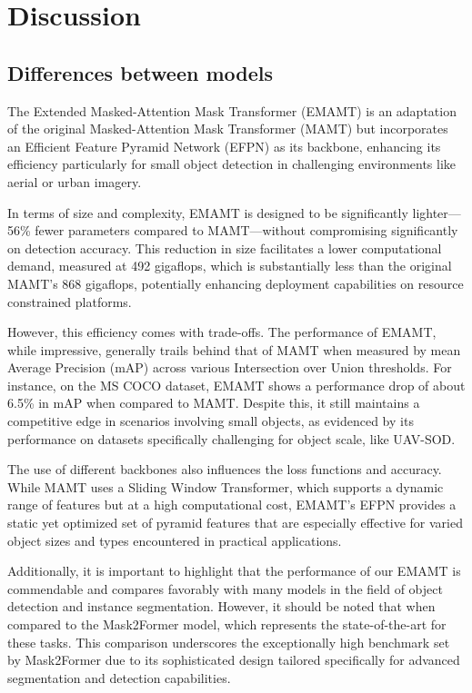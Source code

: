\chapter{Discussion}


\section{Differences between models}

The Extended Masked-Attention Mask Transformer (EMAMT) is an adaptation of the original Masked-Attention Mask Transformer (MAMT) but incorporates 
an Efficient Feature Pyramid Network (EFPN) as its backbone, enhancing its efficiency particularly for small object detection in challenging environments 
like aerial or urban imagery. 

In terms of size and complexity, EMAMT is designed to be significantly lighter—56\% fewer parameters compared to MAMT—without compromising significantly 
on detection accuracy. This reduction in size facilitates a lower computational demand, measured at 492 gigaflops, which is substantially less than the 
original MAMT's 868 gigaflops, potentially enhancing deployment capabilities on resource constrained platforms.

However, this efficiency comes with trade-offs. The performance of EMAMT, while impressive, generally trails behind that of MAMT when measured by 
mean Average Precision (mAP) across various Intersection over Union thresholds. For instance, on the MS COCO dataset, EMAMT shows a performance drop 
of about 6.5\% in mAP when compared to MAMT. Despite this, it still maintains a competitive edge in scenarios involving small objects, as evidenced by its 
performance on datasets specifically challenging for object scale, like UAV-SOD.

The use of different backbones also influences the loss functions and accuracy. While MAMT uses a Sliding Window Transformer, which supports a dynamic 
range of features but at a high computational cost, EMAMT's EFPN provides a static yet optimized set of pyramid features that are especially effective for 
varied object sizes and types encountered in practical applications.

Additionally, it is important to highlight that the performance of our EMAMT is commendable and compares favorably with many models in the field of object 
detection and instance segmentation. However, it should be noted that when compared to the Mask2Former model, which represents the state-of-the-art for these tasks.
This comparison underscores the exceptionally high benchmark set by Mask2Former due to its sophisticated design tailored specifically for advanced 
segmentation and detection capabilities.

